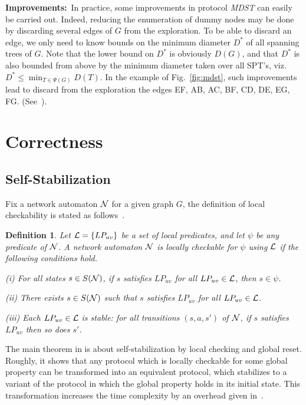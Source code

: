\documentclass[10pt]{article}
\newtheorem{defi}{Definition}[section]
\begin{document}
\noindent
{\bf Improvements:}\, In practice, some improvements in protocol {\em MDST}
can easily be carried out. Indeed, reducing the enumeration of dummy nodes
may be done by discarding several edges of $G$ from the exploration.
To be able to discard an edge, we only need to know bounds on the minimum
diameter $D^*$ of all spanning trees of $G$. Note that the lower bound on
$D^*$ is obviously $D(G)$, and that $D^*$ is also bounded from above by the
minimum diameter taken over all SPT's, viz. $D^* \leq
\min_{T \in \Psi(G)}D(T)$. In the example of Fig.~\ref{fig:mdst}, such
improvements lead to discard from the exploration the edges
EF, AB, AC, BF, CD, DE, EG, FG. (See~\cite{BuBL95}).

\section{Correctness}
\subsection{Self-Stabilization}\label{ss}
Fix a network automaton $\cal N$ for a given graph $G$, the definition of
local checkability is stated as follows~\cite{APVD94}.

\begin{defi}\label{def:local}
Let ${\cal L} = \{LP_{uv}\}$ be a set of local predicates, and let $\psi$
be any predicate of $\cal N$. A network automaton $\cal N$ is locally
checkable for $\psi$ using $\cal L$ if the following conditions hold.

(i) For all states $s \in S({\cal N})$, if $s$ satisfies $LP_{uv}$ for all
$LP_{uv} \in {\cal L}$, then $s \in \psi$.

(ii) There exists $s \in S({\cal N})$ such that $s$ satisfies $LP_{uv}$
for all $LP_{uv} \in {\cal L}$.

(iii) Each $LP_{uv} \in {\cal L}$ is stable: for all transitions
$(s,a,s')$ of $\cal N$, if $s$ satisfies $LP_{uv}$ then so does $s'$.
\end{defi}

The main theorem in \cite{APVD94} is about self-stabilization by local
checking and global reset. Roughly, it shows that any protocol which
is locally checkable for some global property can be transformed into
an equivalent protocol, which stabilizes to a variant of the protocol
in which the global property holds in its initial state. This
transformation increases the time complexity by an overhead given
in~\cite[Theorem 10]{APVD94}.
\end{document}
